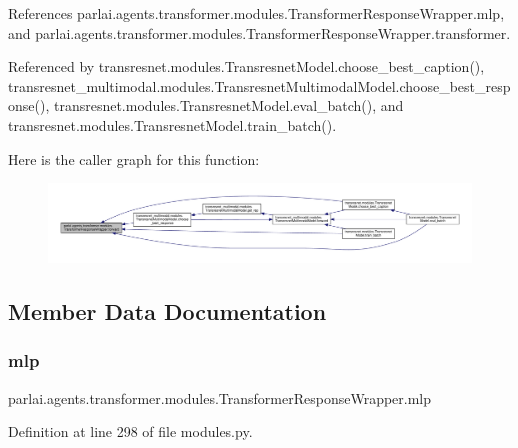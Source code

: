 References parlai.\+agents.\+transformer.\+modules.\+Transformer\+Response\+Wrapper.\+mlp, and parlai.\+agents.\+transformer.\+modules.\+Transformer\+Response\+Wrapper.\+transformer.



Referenced by transresnet.\+modules.\+Transresnet\+Model.\+choose\+\_\+best\+\_\+caption(), transresnet\+\_\+multimodal.\+modules.\+Transresnet\+Multimodal\+Model.\+choose\+\_\+best\+\_\+response(), transresnet.\+modules.\+Transresnet\+Model.\+eval\+\_\+batch(), and transresnet.\+modules.\+Transresnet\+Model.\+train\+\_\+batch().

Here is the caller graph for this function\+:
\nopagebreak
\begin{figure}[H]
\begin{center}
\leavevmode
\includegraphics[width=350pt]{classparlai_1_1agents_1_1transformer_1_1modules_1_1TransformerResponseWrapper_ad716cb3a5874f46b1aa4beb45ba1b944_icgraph}
\end{center}
\end{figure}


\subsection{Member Data Documentation}
\mbox{\label{classparlai_1_1agents_1_1transformer_1_1modules_1_1TransformerResponseWrapper_a11ccb5cd5d1b5236b08c904bdeb9e041}} 
\subsubsection{\texorpdfstring{mlp}{mlp}}
{\footnotesize\ttfamily parlai.\+agents.\+transformer.\+modules.\+Transformer\+Response\+Wrapper.\+mlp}



Definition at line 298 of file modules.\+py.




